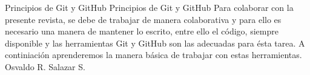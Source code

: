
\Chapter%
         {Principios de Git y GitHub}%
         {Principios de Git y GitHub}%
         {Para colaborar con la presente revista, se debe de trabajar de manera colaborativa y para ello es necesario una manera de mantener lo escrito, entre ello el código, siempre disponible y las herramientas Git y GitHub son las adecuadas para ésta tarea. A continiación aprenderemos la manera básica de trabajar con estas herramientas.}%
         {Osvaldo R. Salazar S.}%

